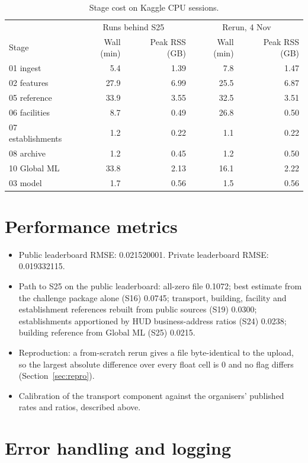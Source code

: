 \documentclass[11pt]{article}
\begin{document}
\begin{table}[htbp]
\centering
\small
\caption{Stage cost on Kaggle CPU sessions.}
\label{tab:runtime}
\begin{tabular}{lrrrr}
\toprule
& \multicolumn{2}{c}{Runs behind S25} & \multicolumn{2}{c}{Rerun, 4 Nov} \\
Stage & Wall (min) & Peak RSS (GB) & Wall (min) & Peak RSS (GB) \\
\midrule
01 ingest & 5.4 & 1.39 & 7.8 & 1.47 \\
02 features & 27.9 & 6.99 & 25.5 & 6.87 \\
05 reference & 33.9 & 3.55 & 32.5 & 3.51 \\
06 facilities & 8.7 & 0.49 & 26.8 & 0.50 \\
07 establishments & 1.2 & 0.22 & 1.1 & 0.22 \\
08 archive & 1.2 & 0.45 & 1.2 & 0.50 \\
10 Global ML & 33.8 & 2.13 & 16.1 & 2.22 \\
03 model & 1.7 & 0.56 & 1.5 & 0.56 \\
\bottomrule
\end{tabular}
\end{table}

\section{Performance metrics}

\begin{itemize}[itemsep=2pt]
\item Public leaderboard RMSE: 0.021520001. Private leaderboard RMSE:
0.019332115.
\item Path to S25 on the public leaderboard: all-zero file 0.1072; best
estimate from the challenge package alone (S16) 0.0745; transport, building,
facility and establishment references rebuilt from public sources (S19)
0.0300; establishments apportioned by HUD business-address ratios (S24)
0.0238; building reference from Global ML (S25) 0.0215.
\item Reproduction: a from-scratch rerun gives a file byte-identical to the
upload, so the largest absolute difference over every float cell is 0 and no
flag differs (Section~\ref{sec:repro}).
\item Calibration of the transport component against the organisers'
published rates and ratios, described above.
\end{itemize}

\section{Error handling and logging}
\end{document}
